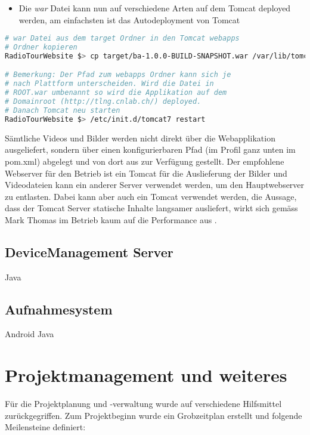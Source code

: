 \begin{itemize}
\item Die \textit{war} Datei kann nun auf verschiedene Arten auf dem Tomcat deployed werden, am einfachsten ist das Autodeployment von Tomcat
\end{itemize}
\begin{lstlisting}[language=Bash, caption=Deployment auf Tomcat]
# war Datei aus dem target Ordner in den Tomcat webapps
# Ordner kopieren
RadioTourWebsite $> cp target/ba-1.0.0-BUILD-SNAPSHOT.war /var/lib/tomcat7/webapps/ROOT.war

# Bemerkung: Der Pfad zum webapps Ordner kann sich je
# nach Plattform unterscheiden. Wird die Datei in
# ROOT.war umbenannt so wird die Applikation auf dem
# Domainroot (http://tlng.cnlab.ch/) deployed.
# Danach Tomcat neu starten
RadioTourWebsite $> /etc/init.d/tomcat7 restart

\end{lstlisting}

Sämtliche Videos und Bilder werden nicht direkt über die Webapplikation ausgeliefert, sondern über einen konfigurierbaren Pfad (im Profil ganz unten im pom.xml) abgelegt und von dort aus zur Verfügung gestellt. Der empfohlene Webserver für den Betrieb ist ein Tomcat für die Auslieferung der Bilder und Videodateien kann ein anderer Server verwendet werden, um den Hauptwebserver zu entlasten. Dabei kann aber auch ein Tomcat verwendet werden, die Aussage, dass der Tomcat Server statische Inhalte langsamer ausliefert, wirkt sich gemäss Mark Thomas im Betrieb kaum auf die Performance aus \cite{thomas2010}.

\subsection{DeviceManagement Server}
Java

\subsection{Aufnahmesystem}
Android Java

\section{Projektmanagement und weiteres}
Für die Projektplanung und -verwaltung wurde auf verschiedene Hilfsmittel zurückgegriffen. Zum Projektbeginn wurde ein Grobzeitplan erstellt und folgende Meilensteine definiert:

